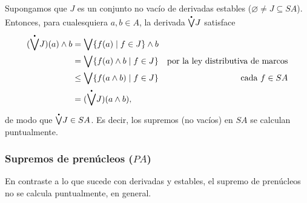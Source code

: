 \documentclass[12pt,letterpaper,titlepage]{article}
\let\emptyset\varnothing
\theoremstyle{definition}
\newcommand\Sup{\bigvee}
\renewcommand\inf{\wedge}
\newcommand\pSup{%
    {\stackrel{\raisebox{-3pt}{\scalebox{0.5}{$\bullet$}}}{\bigvee}}
  }%
\newcommand\tps[2]{\texorpdfstring{#1}{#2}}
\newcommand\<{\langle}
\renewcommand\>{\rangle}
\begin{document}
Supongamos que $J$ es un conjunto no vacío de derivadas estables
($\emptyset\neq J\subseteq SA$).
Entonces, para cualesquiera $a,b\in A$, la derivada $\pSup J$ satisface
\begin{align*}
  (\pSup J)(a)\inf b
  &= \Sup\{f(a) \mid f\in J\} \inf b \\
  &= \Sup\{f(a)\inf b \mid f\in J\}
    & \text{por la ley distributiva de marcos} \\
  &\leq \Sup\{f(a\inf b) \mid f\in J \}
    & \text{cada $f\in SA$} \\
  &= (\pSup J)(a\inf b),
\end{align*}
de modo que $\pSup J\in SA$.
Es decir, los supremos (no vacíos) en $SA$ se calculan
puntualmente.

\subsubsection{Supremos de prenúcleos \tps{($PA$)}{(PA)}}

En contraste a lo que sucede con derivadas y estables, el supremo
de prenúcleos no se calcula puntualmente, en general.
\end{document}
